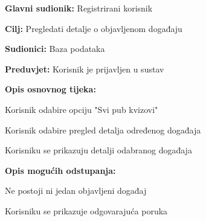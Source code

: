 				
				\noindent {}
				\begin{packed_item}
					
					\item \textbf{Glavni sudionik:} Registrirani korisnik
					\item  \textbf{Cilj:} Pregledati detalje o objavljenom događaju
					\item  \textbf{Sudionici:} Baza podataka
					\item  \textbf{Preduvjet:} Korisnik je prijavljen u sustav
					\item  \textbf{Opis osnovnog tijeka:}
					
					\item[] \begin{packed_enum}
						
						\item Korisnik odabire opciju "Svi pub kvizovi"
						\item Korisnik odabire pregled detalja određenog događaja
						\item Korisniku se prikazuju detalji odabranog događaja
						
					\end{packed_enum}
					
					\item  \textbf{Opis mogućih odstupanja:}
					
					\item[] \begin{packed_item}
						
						\item[1.a] Ne postoji ni jedan objavljeni događaj
						\item[] \begin{packed_enum}
							
							\item Korisniku se prikazuje odgovarajuća poruka
							
						\end{packed_enum}
						
					\end{packed_item}
				\end{packed_item}
				
